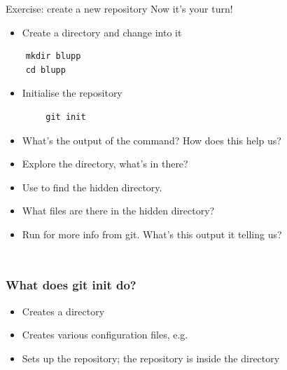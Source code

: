 \begin{verbatim}
\end{verbatim}

\begin{frame}[fragile]{Exercise: create a new repository}
    Now it's your turn!
    \begin{itemize}
        \item Create a directory and change into it
    \end{itemize}
    \begin{verbatim}
    mkdir blupp
    cd blupp
    \end{verbatim}
    \begin{itemize}
        \item Initialise the repository
    \end{itemize}
        \begin{verbatim}
        git init
        \end{verbatim}
    \begin{itemize}
        \item What's the output of the  command?  How does this
            help us?
        \item Explore the directory, what's in there?
        \item Use  to find the hidden directory.
        \item What files are there in the hidden directory?
        \item Run  for more info from git.  What's this
            output it telling us?
    \end{itemize}
\end{frame}

\begin{frame}[fragile]
    \inputminted{bash}{create-example-repo.txt}
    \inputminted{bash}{dot-git-dir-contents.txt}
\end{frame}

\begin{frame}[fragile]
\frametitle{What does git init do?}
\begin{itemize}
    \item Creates a  directory
    \item Creates various configuration files, e.g. 
    \item Sets up the repository; the repository is inside the 
        directory
\end{itemize}
\end{frame}

